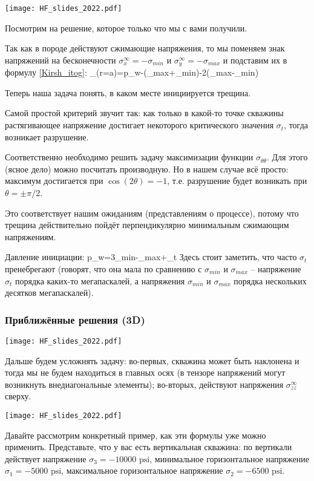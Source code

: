 \documentclass[main.tex]{subfiles}
\begin{document}
\texttt{[image: HF\_slides\_2022.pdf]}

Посмотрим на решение, которое только что мы с вами получили.

Так как в породе действуют сжимающие напряжения, то мы поменяем знак напряжений на бесконечности $\sigma_x^\infty=-\sigma_{min}$ и $\sigma_y^\infty=-\sigma_{max}$ и подставим их в формулу \eqref{Kirsh_itog}:
\beq
\sigma_{\theta\theta}(r=a)=p_w-\left(\sigma_{max}+\sigma_{min}\right)-2\left(\sigma_{max}-\sigma_{min}\right)\cos{\!(2\theta)}
\eeq

Теперь наша задача понять, в каком месте инициируется трещина.

Самой простой критерий звучит так: как только в какой-то точке скважины растягивающее напряжение достигает некоторого критического значения $\sigma_{\!t}$, тогда возникает разрушение.

Соответственно необходимо решить задачу максимизации функции $\sigma_{\theta\theta}$.
Для этого (ясное дело) можно посчитать производную.
Но в нашем случае всё просто: максимум достигается при $\cos{\!(2\theta)}=-1$, т.е. разрушение будет возникать при $\theta=\pm\pi/2$.

Это соответствует нашим ожиданиям (представлениям о процессе), потому что трещина действительно пойдёт перпендикулярно минимальным сжимающим напряжениям.

Давление инициации:
\beq
p_w=3\sigma_{min}-\sigma_{max}+\sigma_t
\eeq
Здесь стоит заметить, что часто $\sigma_{\!t}$ пренебрегают (говорят, что она мала по сравнению с $\sigma_{min}$ и $\sigma_{max}$ -- напряжение $\sigma_{\!t}$ порядка каких-то мегапаскалей, а напряжения $\sigma_{min}$ и $\sigma_{max}$ порядка нескольких десятков мегапаскалей).

\subsubsection{Приближённые решения (3D)}

\texttt{[image: HF\_slides\_2022.pdf]}

Дальше будем усложнять задачу: во-первых, скважина может быть наклонена и тогда мы не будем находиться в главных осях (в тензоре напряжений могут возникнуть внедиагональные элементы); во-вторых, действуют напряжения $\sigma_{zz}^\infty$ сверху.

\texttt{[image: HF\_slides\_2022.pdf]}

Давайте рассмотрим конкретный пример, как эти формулы уже можно применить.
Представьте, что у вас есть вертикальная скважина: по вертикали действует напряжение $\sigma_3=-10000\text{ psi}$, минимальное горизонтальное напряжение $\sigma_1=-5000\text{ psi}$, максимальное горизонтальное напряжение $\sigma_2=-6500\text{ psi}$.
\\
\end{document}
